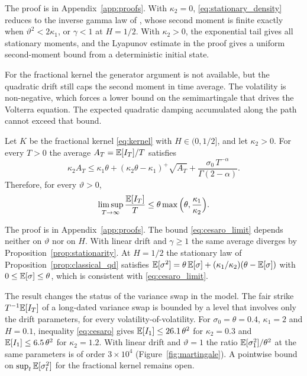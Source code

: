 The proof is in Appendix~\ref{app:proofs}. With $\kappa_2=0$, \eqref{eq:stationary_density} reduces to the inverse gamma law of \citet{SeppRakhmonov2023}, whose second moment is finite exactly when $\vartheta^2<2\kappa_1$, or $\gamma<1$ at $H=1/2$. With $\kappa_2>0$, the exponential tail gives all stationary moments, and the Lyapunov estimate in the proof gives a uniform second-moment bound from a deterministic initial state.

For the fractional kernel the generator argument is not available, but the quadratic drift still caps the second moment in time average. The volatility is non-negative, which forces a lower bound on the semimartingale that drives the Volterra equation. The expected quadratic damping accumulated along the path cannot exceed that bound.

\begin{proposition}\label{prop:cesaro}
Let $K$ be the fractional kernel \eqref{eq:kernel} with $H\in(0,1/2]$, and let $\kappa_2>0$. For every $T>0$ the average $A_T=\mathbb{E}[I_T]/T$ satisfies
\begin{equation}\label{eq:cesaro}
\kappa_2A_T\le\kappa_1\theta+(\kappa_2\theta-\kappa_1)^+\sqrt{A_T}+\frac{\sigma_0\,T^{-\alpha}}{\Gamma(2-\alpha)} .
\end{equation}
Therefore, for every $\vartheta>0$,
\begin{equation}\label{eq:cesaro_limit}
\limsup_{T\to\infty}\frac{\E[I_T]}{T}\le\theta\max\Big(\theta,\frac{\kappa_1}{\kappa_2}\Big) .
\end{equation}
\end{proposition}

The proof is in Appendix~\ref{app:proofs}. The bound \eqref{eq:cesaro_limit} depends neither on $\vartheta$ nor on $H$. With linear drift and $\gamma\ge1$ the same average diverges by Proposition~\ref{prop:stationarity}. At $H=1/2$ the stationary law of Proposition~\ref{prop:classical_qd} satisfies $\mathbb{E}[\sigma^2]=\theta\,\mathbb{E}[\sigma]+(\kappa_1/\kappa_2)(\theta-\mathbb{E}[\sigma])$ with $0\le\mathbb{E}[\sigma]\le\theta$, which is consistent with \eqref{eq:cesaro_limit}.

The result changes the status of the variance swap in the model. The fair strike $T^{-1}\mathbb{E}[I_T]$ of a long-dated variance swap is bounded by a level that involves only the drift parameters, for every volatility-of-volatility. For $\sigma_0=\theta=0.4$, $\kappa_1=2$ and $H=0.1$, inequality \eqref{eq:cesaro} gives $\mathbb{E}[I_1]\le26.1\,\theta^2$ for $\kappa_2=0.3$ and $\mathbb{E}[I_1]\le6.5\,\theta^2$ for $\kappa_2=1.2$. With linear drift and $\vartheta=1$ the ratio $\mathbb{E}[\sigma_1^2]/\theta^2$ at the same parameters is of order $3\times10^4$ (Figure~\ref{fig:martingale}). A pointwise bound on $\sup_t\mathbb{E}[\sigma_t^2]$ for the fractional kernel remains open.

